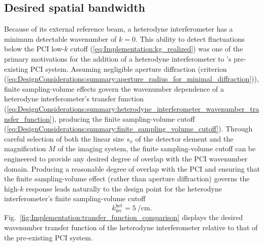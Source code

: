 \subsection{Desired spatial bandwidth}
\label{sec:Implementation:OpticalLayout:spatial_bandwidth}
Because of its external reference beam, a heterodyne interferometer
has a minimum detectable wavenumber of $k = 0$.
This ability to detect fluctuations
below the PCI low-$k$ cutoff (\ref{eq:Implementation:kg_realized})
was one of the primary motivations
for the addition of a heterodyne interferometer
to \diiid's pre-existing PCI system.
Assuming negligible aperture diffraction
(criterion (\ref{eq:DesignConsiderations:summary:aperture_radius_for_minimal_diffraction})),
finite sampling-volume effects govern the wavenumber dependence
of a heterodyne interferometer's transfer function
(\ref{eq:DesignConsiderations:summary:heterodyne_interferometer_wavenumber_transfer_function}),
producing the finite sampling-volume cutoff
(\ref{eq:DesignConsiderations:summary:finite_sampling_volume_cutoff}).
Through careful selection of both
the linear size $s_x$ of the detector element
and the magnification $M$ of the imaging system,
the finite sampling-volume cutoff can be engineered
to provide any desired degree of overlap
with the PCI wavenumber domain.
Producing a reasonable degree of overlap with the PCI and
ensuring that the finite sampling-volume effect
(rather than aperture diffraction)
governs the high-$k$ response
leads naturally to the design point for
the heterodyne interferometer's finite sampling-volume cutoff
\begin{equation}
  k_{\text{fsv}}^{\text{het}} = \SI{5}{\per\centi\meter}.
  \label{eq:Implementation:kfsv_interferometer_design}
\end{equation}
Fig.~\ref{fig:Implementation:transfer_function_comparison}
displays the desired wavenumber transfer function
of the heterodyne interferometer relative to
that of the pre-existing PCI system.

